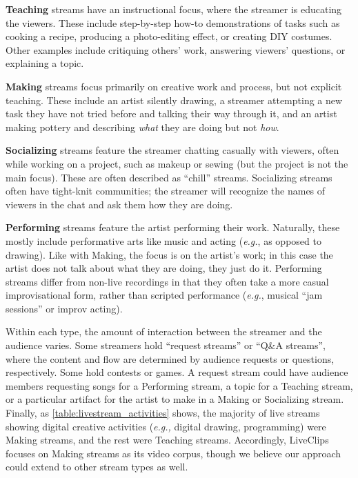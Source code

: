 \textbf{Teaching} streams have an instructional focus, where the stream\-er is educating the viewers. These include step-by-step how-to demonstrations of tasks such as cooking a recipe, producing a photo-editing effect, or creating DIY costumes. Other examples include critiquing others' work, answering viewers' questions, or explaining a topic.

\textbf{Making} streams focus primarily on creative work and process, but not explicit teaching. These include an artist silently drawing, a streamer attempting a new task they have not tried before and talking their way through it, and an artist making pottery and describing \textit{what} they are doing but not \textit{how}. 

\textbf{Socializing} streams feature the streamer chatting casually with viewers, often while working on a project, such as makeup or sewing (but the project is not the main focus). These are often described as ``chill'' streams. Socializing streams often have tight-knit communities; the streamer will recognize the names of viewers in the chat and ask them how they are doing.

\textbf{Performing} streams feature the artist performing their work. Naturally, these mostly include performative arts like music and acting (\textit{e.g.}, as opposed to drawing). Like with Making, the focus is on the artist's work; in this case the artist does not talk about what they are doing, they just do it. Performing streams differ from non-live recordings in that they often take a more casual improvisational form, rather than scripted performance (\textit{e.g.}, musical ``jam sessions'' or improv acting).

Within each type, the amount of interaction between the stream\-er and the audience varies. Some streamers hold ``request streams'' or ``Q\&A streams'', where the content and flow are determined by audience requests or questions, respectively. Some hold contests or games. A request stream could have audience members requesting songs for a Performing stream, a topic for a Teaching stream, or a particular artifact for the artist to make in a Making or Socializing stream. Finally, as \autoref{table:livestream_activities} shows, the majority of live streams showing digital creative activities (\textit{e.g.,} digital drawing, programming) were Making streams, and the rest were Teaching streams. Accordingly, LiveClips focuses on Making streams as its video corpus, though we believe our approach could extend to other stream types as well.

